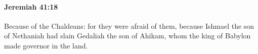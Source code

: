 
		\paragraph{Jeremiah 41:18} %
			\label{JEREMIAH-41-18}

			Because of the Chaldeans: for they were afraid of them, because Ishmael the son of Nethaniah had slain Gedaliah the son of Ahikam, whom the king of Babylon made governor in the land.

